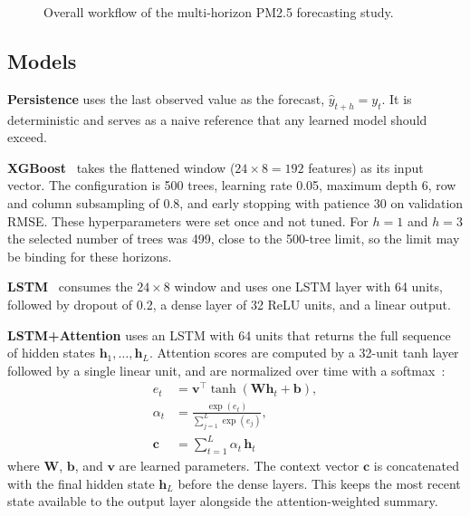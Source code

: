 \documentclass[conference]{IEEEtran}
\begin{document}
\begin{figure}[htbp]
\caption{Overall workflow of the multi-horizon PM2.5 forecasting study.}
\label{fig:methodology}
\end{figure}

\subsection{Models}
\textbf{Persistence} uses the last observed value as the forecast, \(\hat{y}_{t+h}=y_t\). It is deterministic and serves as a naive reference that any learned model should exceed.

\textbf{XGBoost}~\cite{chen2016} takes the flattened window (\(24\times 8 = 192\) features) as its input vector. The configuration is 500 trees, learning rate 0.05, maximum depth 6, row and column subsampling of 0.8, and early stopping with patience 30 on validation RMSE. These hyperparameters were set once and not tuned. For \(h=1\) and \(h=3\) the selected number of trees was 499, close to the 500-tree limit, so the limit may be binding for these horizons.

\textbf{LSTM}~\cite{hochreiter1997} consumes the \(24\times 8\) window and uses one LSTM layer with 64 units, followed by dropout of 0.2, a dense layer of 32 ReLU units, and a linear output.

\textbf{LSTM+Attention} uses an LSTM with 64 units that returns the full sequence of hidden states \(\mathbf{h}_1,\dots,\mathbf{h}_L\). Attention scores are computed by a 32-unit tanh layer followed by a single linear unit, and are normalized over time with a softmax~\cite{bahdanau2015}:
\begin{equation}
\begin{aligned}
e_t &= \mathbf{v}^\top \tanh(\mathbf{W}\mathbf{h}_t + \mathbf{b}),\\
\alpha_t &= \frac{\exp(e_t)}{\sum_{j=1}^{L}\exp(e_j)},\\
\mathbf{c} &= \sum_{t=1}^{L}\alpha_t\,\mathbf{h}_t
\end{aligned}
\end{equation}
where \(\mathbf{W}\), \(\mathbf{b}\), and \(\mathbf{v}\) are learned parameters. The context vector \(\mathbf{c}\) is concatenated with the final hidden state \(\mathbf{h}_L\) before the dense layers. This keeps the most recent state available to the output layer alongside the attention-weighted summary.
\end{document}

